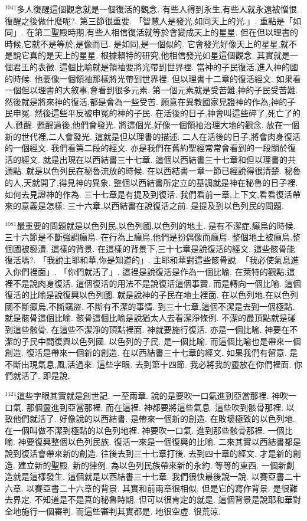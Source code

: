 \documentclass{book}
\begin{document}
$^{1041}$多人復醒這個觀念就是一個復活的觀念.
有些人得到永生,有些人就永遠被憎恨.
復醒之後做什麼呢?.
第三節很重要.
「智慧人是發光,如同天上的光.」.
重點是「如同」.
在第二聖殿時期,有些人相信復活就等於會變成天上的星星.
但在但以理書的時候,它就不是等於,是像而已.
是如同,是一個似的.
它會發光好像天上的星星,就不是說它真的是天上的星星.
根據賴特的研究,他相信發光如星這個觀念.
其實就是一個君王的表徵.
這個比喻就是領袖要將光帶到世界裡.
當神的子民復活,進入神的國的時候.
他要像一個領袖那樣將光帶到世界裡.
但以理書十二章的復活經文.
如果看一個但以理書的大敘事,會看到很多元素.
第一個元素就是受苦難,神的子民受苦難.
然後就是將來神的復活,都是會為一些受苦.
願意在異教國家見證神的作為,神的子民申冤.
然後這些平反被申冤的神的子民.
在活後的日子,神會叫這些碎了,死亡了的人,甦醒.
甦醒過後,他們會發光.
將這個光,好像一個領袖治理大地的觀念.
放在一個新的世代裡,二人會發光.
這就是但以理書的描述.
二人在活後的日子,將會肉身復活的一個經文.
我們看第二段的經文.
亦是我們在舊約聖經常常會看到的一段關於復活的經文.
就是出現在以西結書三十七章.
這個以西結書三十七章和但以理書的共通點.
就是以色列民在秘魯流放的時候.
在以西結書一章一節已經說得很清楚.
秘魯的人,天就開了,得見神的異象.
整個以西結書所定立的基調就是神在秘魯的日子裡.
如何去見證神的作為.
三十七章是有提及到復活.
我們看前一章,上下文,看看復活帶來的意義是怎樣.
三十六章,以西結書在說復活之前.
是提及到以色列民的問題.

$^{1081}$最重要的問題就是以色列民,以色列國,以色列的地土.
是有不潔症,癲烏的時候.
三十六節是不斷強調癲烏.
在行為上癲烏,他們是扮偶像而癲烏.
整個地土被癲烏,整個國被褻瀆.
這樣的背景.
在這樣的背景下,三十七章是說復活的經文.
這些骸骨能復活嗎?.
「我說主耶和華,你是知道的」.
主耶和華對這些骸骨說.
「我必使氣息進入你們裡面」.
「你們就活了」.
這裡是說復活是作為一個比喻.
在萊特的觀點,這裡不是說肉身復活.
這個復活的用法不是說復活這個事實.
而是轉向一個比喻.
這個復活的比喻是說復興以色列國.
就是說神的子民在地土裡面.
在以色列地,在以色列國不斷癲烏,不斷竊盜.
不斷有不潔的事情.
到三十七章,這個不潔是去到一個極點.
就是骸骨這個比喻.
骸骨這個比喻是說猶太人去看潔淨條例.
不潔的最頂點就是碰到這些骸骨.
在這些不潔淨的頂點裡面.
神就要施行復活.
亦是一個比喻.
神要在不潔的子民中間復興以色列國.
以色列的子民.
是一個比喻.
而這個比喻也是帶來一個創造.
復活是帶來一個新的創造.
在以西結書三十七章的經文.
如果我們有留意.
是不斷出現氣息,風,活過來.
這些字眼.
去到第十四節.
我必將我的靈放在你們裡面.
你們就活了.
即是說.

$^{1121}$這些字眼其實就是創世記.
一至兩章.
說的是要吹一口氣進到亞當那裡.
神吹一口氣.
那個靈進到亞當那裡.
而在這裡.
神都要將這些氣息.
這些吹到骸骨那裡.
以致他們就活了.
好像說的以西結書.
是帶來一個新的創造.
在敗壞極致的以色列地.
在一個叫做不潔到極點的以色列地裡.
神要吹一口氣.
進到那些骸骨那裡.
一個比喻.
神要復興整個以色列民族.
復活一來是一個復興的比喻.
二來其實以西結書都是說到復活會帶來新的創造.
往後去到三十七章打後.
去到四十章的經文.
才是新的創造.
建立新的聖殿.
新的律例.
為以色列民族帶來新的永約.
等等的東西.
一個新創造就是這樣發生.
這個就是以西結書三十七章.
我們很快最後說一說.
以賽亞書二十六章.
以賽亞書二十六章的背景.
其實和前兩章很相似.
但是它的寫作背景.
是很難去界定.
不知道是不是真的秘魯時期.
但可以很肯定的就是.
這個背景是說耶和華對全地施行一個審判.
而這些審判其實都是.
地很空虛.
很荒涼.
\end{document}
